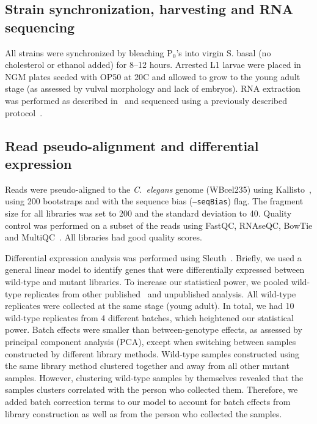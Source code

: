 \documentclass[10pt, twocolumn]{article}
\newcommand{\cel}{\emph{C.~elegans}}
\begin{document}
\subsection*{Strain synchronization, harvesting and RNA sequencing}
All strains were synchronized by bleaching
P$_0$'s into virgin S. basal (no cholesterol or ethanol added) for 8--12 hours.
Arrested L1 larvae were placed in NGM plates seeded with OP50 at 20\degree{}C
and allowed to grow to the young adult stage (as assessed by vulval morphology
and lack of  embryos). RNA extraction was performed as described in~\cite{} and
sequenced using a previously described protocol~\cite{Angeles-Albores2017}.

\subsection*{Read pseudo-alignment and differential expression}
Reads were pseudo-aligned to the \cel{} genome (WBcel235) using
Kallisto~\cite{Bray2016}, using 200 bootstraps and with the sequence bias
(\texttt{--seqBias}) flag. The fragment size for all libraries was set to 200
and the standard deviation to 40. Quality control was performed on a subset of
the reads using FastQC, RNAseQC, BowTie and
MultiQC~\cite{Andrews2010,Deluca2012,Langmead2009,Ewels2016}. All libraries had
good quality scores.

Differential expression analysis was performed using
Sleuth~\cite{Pimentel2016a}. Briefly, we used a general linear model to identify
genes that were differentially expressed between wild-type and mutant libraries.
To increase our statistical power, we pooled wild-type replicates from other
published~\cite{} and unpublished analysis. All wild-type replicates were
collected at the same stage (young adult). In total, we had 10 wild-type
replicates from 4 different batches, which heightened our statistical power.
Batch effects were smaller than between-genotype effects, as assessed by
principal component analysis (PCA), except when switching between samples
constructed by different library methods. Wild-type samples constructed using
the same library method clustered together and away from all other mutant
samples. However, clustering wild-type samples by themselves revealed that the
samples clusters correlated with the person who collected them. Therefore, we
added batch correction terms to our model to account for batch effects from
library construction as well as from the person who collected the samples.
\end{document}
